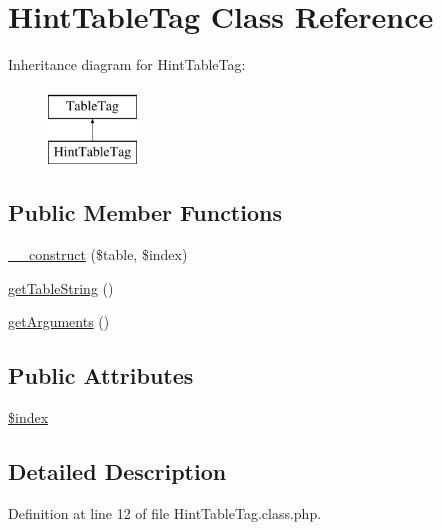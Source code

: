 \hypertarget{classHintTableTag}{\section{Hint\-Table\-Tag Class Reference}
\label{classHintTableTag}
}
Inheritance diagram for Hint\-Table\-Tag\-:\begin{figure}[H]
\begin{center}
\leavevmode
\includegraphics[height=2.000000cm]{classHintTableTag}
\end{center}
\end{figure}
\subsection*{Public Member Functions}
\begin{DoxyCompactItemize}
\item 
\hyperlink{classHintTableTag_a9ae2de27108acf404c781010bc698d95}{\-\_\-\-\_\-construct} (\$table, \$index)
\item 
\hyperlink{classHintTableTag_a39753285a32f1624ab5df5768ce93cdf}{get\-Table\-String} ()
\item 
\hyperlink{classHintTableTag_a774a5f31c9ceb19dd411a92000066741}{get\-Arguments} ()
\end{DoxyCompactItemize}
\subsection*{Public Attributes}
\begin{DoxyCompactItemize}
\item 
\hyperlink{classHintTableTag_aaed2fb461aff0380f77a16df5d04298c}{\$index}
\end{DoxyCompactItemize}


\subsection{Detailed Description}


Definition at line 12 of file Hint\-Table\-Tag.\-class.\-php.



